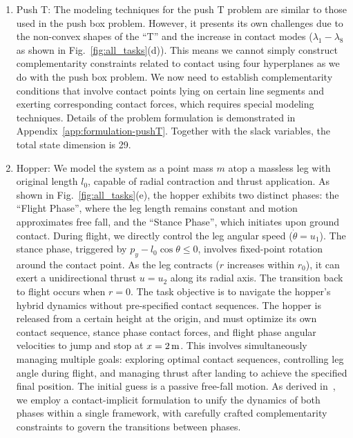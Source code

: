 \begin{enumerate}
\item Push T: The modeling techniques for the push T problem are similar to those used in the push box problem. However, it presents its own challenges due to the non-convex shapes of the ``T'' and the increase in contact modes ($\lambda_1-\lambda_8$ as shown in Fig.~\ref{fig:all_tasks}(d)). This means we cannot simply construct complementarity constraints related to contact using four hyperplanes as we do with the push box problem. We now need to establish complementarity conditions that involve contact points lying on certain line segments and exerting corresponding contact forces, which requires special modeling techniques. Details of the problem formulation is demonstrated in Appendix~\ref{app:formulation-pushT}. Together with the slack variables, the total state dimension is 29.
\item Hopper: We model the system as a point mass $m$ atop a massless leg with original length $l_0$, capable of radial contraction and thrust application. As shown in Fig.~\ref{fig:all_tasks}(e), the hopper exhibits two distinct phases: the ``Flight Phase'', where the leg length remains constant and motion approximates free fall, and the ``Stance Phase'', which initiates upon ground contact. During flight, we directly control the leg angular speed ($\dot{\theta} = u_1$). The stance phase, triggered by $p_y - l_0\cos\theta \leq 0$, involves fixed-point rotation around the contact point. As the leg contracts ($r$ increases within $r_0$), it can exert a unidirectional thrust $u = u_2$ along its radial axis. The transition back to flight occurs when $r = 0$.
The task objective is to navigate the hopper's hybrid dynamics without pre-specified contact sequences. The hopper is released from a certain height at the origin, and must optimize its own contact sequence, stance phase contact forces, and flight phase angular velocities to jump and stop at $x = 2\,\textup{m}$. This involves simultaneously managing multiple goals: exploring optimal contact sequences, controlling leg angle during flight, and managing thrust after landing to achieve the specified final position. The initial guess is a passive free-fall motion.
As derived in~, we employ a contact-implicit formulation to unify the dynamics of both phases within a single framework, with carefully crafted complementarity constraints to govern the transitions between phases.


\end{enumerate}

